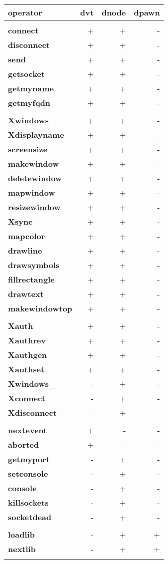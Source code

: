 \begin{tabular}{>{\sffamily\bfseries}l>{\sffamily}r>{\sffamily}r>{\sffamily}r}
operator & dvt & dnode & dpawn \\
\hline\\
connect & + & + & - \\
disconnect & + & + & - \\
send & + & + & - \\
getsocket & + & + & - \\
getmyname & + & + & - \\
getmyfqdn & + & + & - \\\\
Xwindows & + & + & - \\
Xdisplayname & + & + & - \\
screensize & + & + & - \\
makewindow & + & + & - \\
deletewindow & + & + & - \\
mapwindow & + & + & - \\
resizewindow & + & + & - \\
Xsync & + & + & - \\
mapcolor & + & + & - \\
drawline & + & + & - \\
drawsymbols & + & + & - \\
fillrectangle & + & + & - \\
drawtext & + & + & - \\
makewindowtop & + & + & - \\\\
Xauth & + & + & - \\
Xauthrev & + & + & - \\
Xauthgen & + & + & - \\
Xauthset & + & + & - \\
Xwindows\_ & - & + & - \\
Xconnect & - & + & - \\
Xdisconnect & - & + & - \\\\

nextevent & + & - & - \\
aborted & + & - & - \\
getmyport & - & + & - \\
setconsole & - & + & - \\
console & - & + & - \\
killsockets & - & + & - \\
socketdead & - & + & - \\\\
loadlib & - & + & + \\
nextlib & - & + & + \\\\
\end{tabular}

